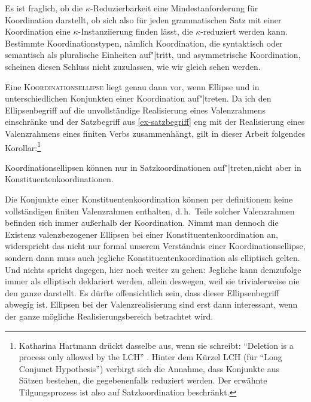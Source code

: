 Es ist fraglich, ob die $\kappa$-Reduzierbarkeit eine Mindestanforderung für Koordination darstellt, ob sich also für jeden grammatischen Satz mit einer Koordination eine $\kappa$-Instanziierung finden lässt, die $\kappa$-reduziert werden kann. Bestimmte Koordinationstypen, nämlich Koordination, die syntaktisch oder semantisch als pluralische Einheiten auf"|tritt, und asymmetrische Koordination, scheinen diesen Schluss nicht zuzulassen, wie wir gleich sehen werden. 

Eine \textsc{Koordinationsellipse} liegt genau dann vor, wenn Ellipse und  in unterschiedlichen Konjunkten einer Koordination auf"|treten. Da ich den Ellipsenbegriff auf die unvollständige Realisierung eines Valenzrahmens einschränke und der Satzbegriff aus \ref{ex-satzbegriff} eng mit der Realisierung eines Valenzrahmens eines finiten Verbs zusammenhängt, gilt in dieser Arbeit folgendes Korollar:\footnote{Katharina Hartmann drückt dasselbe aus, wenn sie schreibt: "`Deletion is a process only allowed by the LCH"' \citep[33]{Hartmann:00}. Hinter dem Kürzel LCH (für "`Long Conjunct Hypothesis"') verbirgt sich die Annahme, dass Konjunkte aus Sätzen bestehen, die gegebenenfalls reduziert werden. Der erwähnte Tilgungsprozess ist also auf Satzkoordination beschränkt. } 
\begin{corollary}
Koordinationsellipsen können nur in Satzkoordinationen auf"|treten,\linebreak nicht aber in Konstituentenkoordinationen.
\end{corollary}
Die Konjunkte einer Konstituentenkoordination können per definitionem keine vollständigen finiten Valenzrahmen enthalten, d.\,h.\ Teile solcher Valenzrahmen befinden sich immer au\ss erhalb der Koordination. Nimmt man dennoch die Existenz valenzbezogener Ellipsen bei einer Konstituentenkoordination an, widerspricht das nicht nur formal unserem Verständnis einer Koordinationsellipse, sondern dann muss auch jegliche Konstituentenkoordination als elliptisch gelten. Und nichts spricht dagegen, hier noch weiter zu gehen: Jegliche  kann demzufolge immer als elliptisch deklariert werden, allein deswegen, weil sie trivialerweise nie den ganze  darstellt. Es dürfte offensichtlich sein, dass dieser Ellipsenbegriff abwegig ist. Ellipsen bei der Valenzrealisierung sind erst dann interessant, wenn der ganze mögliche Realisierungsbereich betrachtet wird. 

